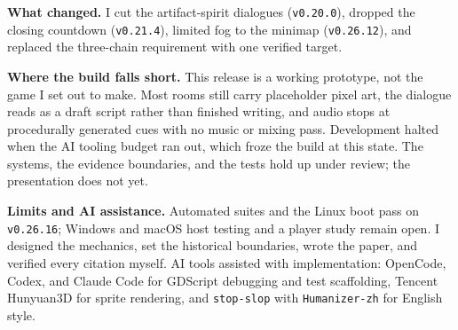 \documentclass[11pt,a4paper]{article}
\begin{document}
\textbf{What changed.} I cut the artifact-spirit dialogues (\texttt{v0.20.0}), dropped the closing countdown (\texttt{v0.21.4}), limited fog to the minimap (\texttt{v0.26.12}), and replaced the three-chain requirement with one verified target.

\textbf{Where the build falls short.} This release is a working prototype, not the game I set out to make. Most rooms still carry placeholder pixel art, the dialogue reads as a draft script rather than finished writing, and audio stops at procedurally generated cues with no music or mixing pass. Development halted when the AI tooling budget ran out, which froze the build at this state. The systems, the evidence boundaries, and the tests hold up under review; the presentation does not yet.

\textbf{Limits and AI assistance.} Automated suites and the Linux boot pass on \texttt{v0.26.16}; Windows and macOS host testing and a player study remain open. I designed the mechanics, set the historical boundaries, wrote the paper, and verified every citation myself. AI tools assisted with implementation: OpenCode, Codex, and Claude Code for GDScript debugging and test scaffolding, Tencent Hunyuan3D for sprite rendering, and \texttt{stop-slop} with \texttt{Humanizer-zh} for English style.
\singlespacing
\printbibliography[title={Bibliography}]
\end{document}
